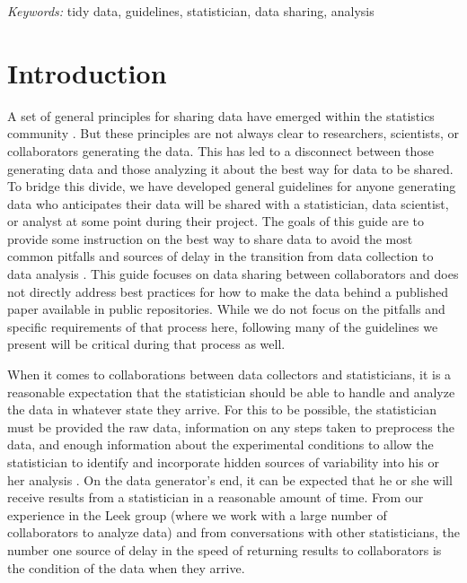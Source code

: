 \documentclass[12pt]{article}
\begin{document}
\noindent%
{\it Keywords:} tidy data, guidelines, statistician, data sharing, analysis
\vfill

\newpage
{} %

\section{Introduction}\label{introduction}

A set of general principles for sharing data have emerged within the
statistics community
\citep[\citet{_tidy_data},\citet{wilson_good_2016},\citet{white_nine_2013}]{_data_org}.
But these principles are not always clear to researchers, scientists, or
collaborators generating the data. This has led to a disconnect between
those generating data and those analyzing it about the best way for data
to be shared. To bridge this divide, we have developed general
guidelines for anyone generating data who anticipates their data will be
shared with a statistician, data scientist, or analyst at some point
during their project. The goals of this guide are to provide some
instruction on the best way to share data to avoid the most common
pitfalls and sources of delay in the transition from data collection to
data analysis \citep{leek2015opinion}. This guide focuses on data
sharing between collaborators and does not directly address best
practices for how to make the data behind a published paper available in
public repositories. While we do not focus on the pitfalls and specific
requirements of that process here, following many of the guidelines we
present will be critical during that process as well.

When it comes to collaborations between data collectors and
statisticians, it is a reasonable expectation that the statistician
should be able to handle and analyze the data in whatever state they
arrive. For this to be possible, the statistician must be provided the
raw data, information on any steps taken to preprocess the data, and
enough information about the experimental conditions to allow the
statistician to identify and incorporate hidden sources of variability
into his or her analysis \citep{baggerly2010disclose}. On the data
generator's end, it can be expected that he or she will receive results
from a statistician in a reasonable amount of time. From our experience
in the Leek group \citep{_jtleek} (where we work with a large number of
collaborators to analyze data) and from conversations with other
statisticians, the number one source of delay in the speed of returning
results to collaborators is the condition of the data when they arrive.
\end{document}
